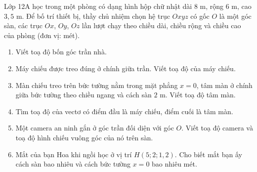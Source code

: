 \begin{bai}Lớp 12A học trong một phòng có dạng hình hộp chữ nhật dài $8$ m, rộng $6$ m, cao $3{,}5$ m. Để bố trí thiết bị, thầy chủ nhiệm chọn hệ trục $Oxyz$ có gốc $O$ là một góc sàn, các trục $Ox$, $Oy$, $Oz$ lần lượt chạy theo chiều dài, chiều rộng và chiều cao của phòng (đơn vị: mét).
\begin{enumerate}[label=\alph*)]
\item Viết toạ độ bốn góc trần nhà.
\item Máy chiếu được treo đúng ở chính giữa trần. Viết toạ độ của máy chiếu.
\item Màn chiếu treo trên bức tường nằm trong mặt phẳng $x=0$, tâm màn ở chính giữa bức tường theo chiều ngang và cách sàn $2$ m. Viết toạ độ tâm màn.
\item Tìm toạ độ của vectơ có điểm đầu là máy chiếu, điểm cuối là tâm màn.
\item Một camera an ninh gắn ở góc trần đối diện với góc $O$. Viết toạ độ camera và toạ độ hình chiếu vuông góc của nó trên sàn.
\item Mắt của bạn Hoa khi ngồi học ở vị trí $H(5;2;1{,}2)$. Cho biết mắt bạn ấy cách sàn bao nhiêu và cách bức tường $x=0$ bao nhiêu mét.
\end{enumerate}
\end{bai}
